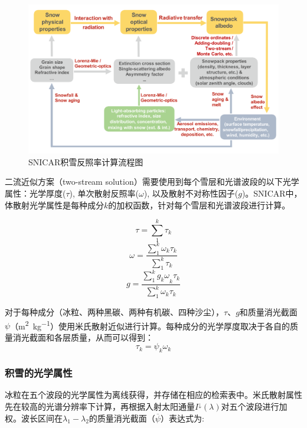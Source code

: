 {
\begin{figure}[htbp]
\centering
\includegraphics[width=1\columnwidth]{Figures/辐射过程及辐射通量计算/SNICAR模型计算流程图.png}
\caption{SNICAR积雪反照率计算流程图\citep{he2020SnowAlbedoRadiative}}
\label{fig:SNICAR模型流程图}
\end{figure}
}

二流近似方案（two-stream
solution）需要使用到每个雪层和光谱波段的以下光学属性：光学厚度($\tau$),
单次散射反照率($\omega$),
以及散射不对称性因子($g$)。SNICAR中，体散射光学属性是每种成分$k$的加权函数，针对每个雪层和光谱波段进行计算。

\begin{equation}
\tau = \sum_{1}^{k}\tau_{k}
\end{equation}
%
\begin{equation}
\omega = \frac{\sum_{1}^{k}\omega_{k}\tau_{k}}{\sum_{1}^{k}\tau_{k}}
\end{equation}
%
\begin{equation}
g = \frac{\sum_{1}^{k}{g_{k}\omega}_{k}\tau_{k}}{\sum_{1}^{k}\omega_{k}\tau_{k}}
\end{equation}

对于每种成分（冰粒、两种黑碳、两种有机碳、四种沙尘），$\tau$、$g$和质量消光截面$\psi$（\unit{m^2.kg^{-1}}）使用米氏散射近似进行计算。每种成分的光学厚度取决于各自的质量消光截面和各层质量，从而可以得到：
\begin{equation}
\tau_{k} = \psi_{k}\omega_{k}
\end{equation}

\subsubsection{积雪的光学属性}
冰粒在五个波段的光学属性为离线获得，并存储在相应的检索表中。米氏散射属性先在较高的光谱分辨率下计算，再根据入射太阳通量\(I^{\downarrow}(\lambda)\)对五个波段进行加权。波长区间在$\lambda_{1}-\lambda_{2}$的质量消光截面（\(\overline{\psi}\)）表达式为:

